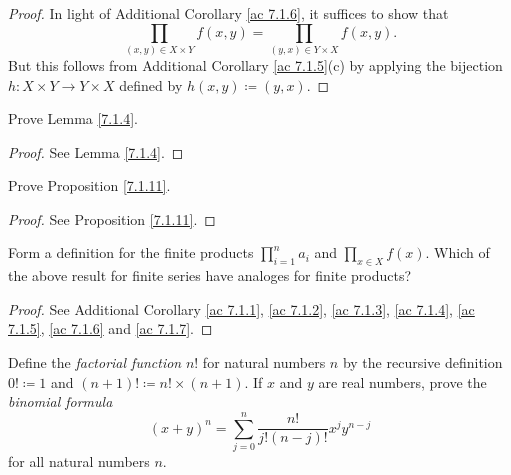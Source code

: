 \begin{proof}
    In light of Additional Corollary \ref{ac 7.1.6}, it suffices to show that
    \[
        \prod_{(x, y) \in X \times Y} f(x, y) = \prod_{(y, x) \in Y \times X} f(x, y).
    \]
    But this follows from Additional Corollary \ref{ac 7.1.5}(c) by applying the bijection \(h : X \times Y \to Y \times X\) defined by \(h(x, y) \coloneqq (y, x)\).
\end{proof}

\exercisesection

\begin{exercise}\label{ex 7.1.1}
    Prove Lemma \ref{7.1.4}.
\end{exercise}

\begin{proof}
    See Lemma \ref{7.1.4}.
\end{proof}

\begin{exercise}\label{ex 7.1.2}
    Prove Proposition \ref{7.1.11}.
\end{exercise}

\begin{proof}
    See Proposition \ref{7.1.11}.
\end{proof}

\begin{exercise}\label{ex 7.1.3}
    Form a definition for the finite products \(\prod_{i = 1}^n a_i\) and \(\prod_{x \in X} f(x)\).
    Which of the above result for finite series have analoges for finite products?
\end{exercise}

\begin{proof}
    See Additional Corollary \ref{ac 7.1.1}, \ref{ac 7.1.2}, \ref{ac 7.1.3}, \ref{ac 7.1.4}, \ref{ac 7.1.5}, \ref{ac 7.1.6} and \ref{ac 7.1.7}.
\end{proof}

\begin{exercise}\label{ex 7.1.4}
    Define the \emph{factorial function} \(n!\) for natural numbers \(n\) by the recursive definition \(0! \coloneqq 1\) and \((n + 1)! \coloneqq n! \times (n + 1)\).
    If \(x\) and \(y\) are real numbers, prove the \emph{binomial formula}
    \[
        (x + y)^n = \sum_{j = 0}^n \frac{n!}{j!(n - j)!} x^j y^{n - j}
    \]
    for all natural numbers \(n\).
\end{exercise}

